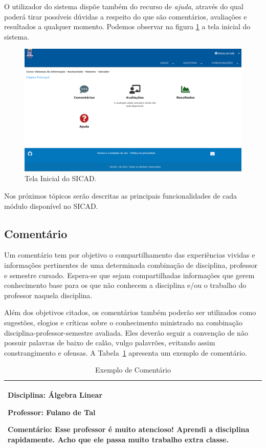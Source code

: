 \documentclass[12pt, a4paper]{report}
\begin{document}
O utilizador do sistema dispõe também do recurso de \textit{ajuda}, através do qual poderá tirar possíveis dúvidas a respeito do que são comentários, avaliações e resultados a qualquer momento. Podemos observar na figura \ref{fig:home_administrador} a tela inicial do sistema.
\begin{figure}
\centering
\includegraphics[scale=0.5]{home_administrador2.png}
\caption{Tela Inicial do SICAD.}
\label{fig:home_administrador}
\end{figure}

Nos próximos tópicos serão descritas as principais funcionalidades de cada módulo disponível no \ac{SICAD}.

\subsection{Comentário}
\label{subsec:comentario}
Um comentário tem por objetivo o compartilhamento das experiências vividas e informações pertinentes de uma determinada combinação de disciplina, professor e semestre cursado. Espera-se que sejam compartilhadas informações que gerem conhecimento base para os que não conhecem a disciplina e/ou o trabalho do professor naquela disciplina.

Além dos objetivos citados, os comentários também poderão ser utilizados como sugestões, elogios e críticas sobre o conhecimento ministrado na combinação disciplina-professor-semestre avaliada. Eles deverão seguir a convenção de não possuir palavras de baixo de calão, vulgo palavrões, evitando assim constrangimento e ofensas. A Tabela~\ref{tab:comentario} apresenta um exemplo de comentário.

\begin{table}[h]
 \centering
 {\renewcommand\arraystretch{1.25}
 \begin{tabular}{ l l }
  \cline{1-1}\cline{2-2}  
    \multicolumn{1}{|p{7.850cm}|}{\par \textbf{Disciplina:} Álgebra Linear
    \par \textbf{Professor:} Fulano de Tal
    \par \textbf{Comentário:} Esse professor é muito atencioso! Aprendi a disciplina rapidamente. Acho que ele passa muito trabalho extra classe.}
  \\  
  \hline
 \end{tabular}}
 \caption{Exemplo de Comentário}
 \label{tab:comentario}
\end{table}
\end{document}
